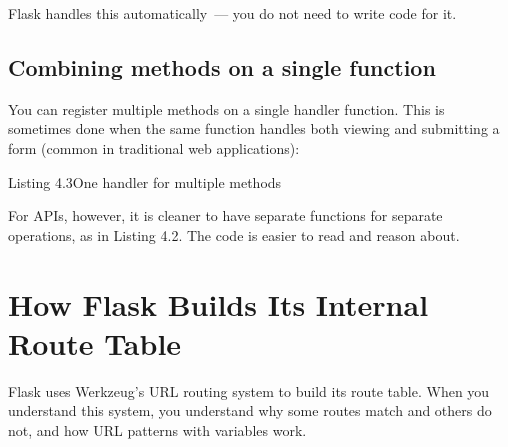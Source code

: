 \noindent{}Flask handles this automatically~--- you do not need to write code for it.

\subsection*{Combining methods on a single function}\label{04-request-handling-paths:combining-methods-on-a-single-function}

You can register multiple methods on a single handler function. This is sometimes done when the same function handles both viewing and submitting a form (common in traditional web applications):

\begin{codeboxcap}[short]{\textcolor{accent}{Listing 4.3}\enspace One handler for multiple methods}

\begin{Shaded}
\begin{Highlighting}[]
\NormalTok{(}\OperatorTok{=}\NormalTok{[}\NormalTok{, }\NormalTok{])}
    \OperatorTok{==} \NormalTok{:}
        \NormalTok{: []\})}
    \OperatorTok{==} \NormalTok{:}
\OperatorTok{=}
        \NormalTok{: }\NormalTok{\}), }
\end{Highlighting}
\end{Shaded}

\end{codeboxcap}

\noindent{}For APIs, however, it is cleaner to have separate functions for separate operations, as in Listing 4.2. The code is easier to read and reason about.

\setcounter{section}{3}
\section{How Flask Builds Its Internal Route Table}\label{04-request-handling-paths:44-how-flask-builds-its-internal-route-table}

Flask uses Werkzeug's URL routing system to build its route table. When you understand this system, you understand why some routes match and others do not, and how URL patterns with variables work.

